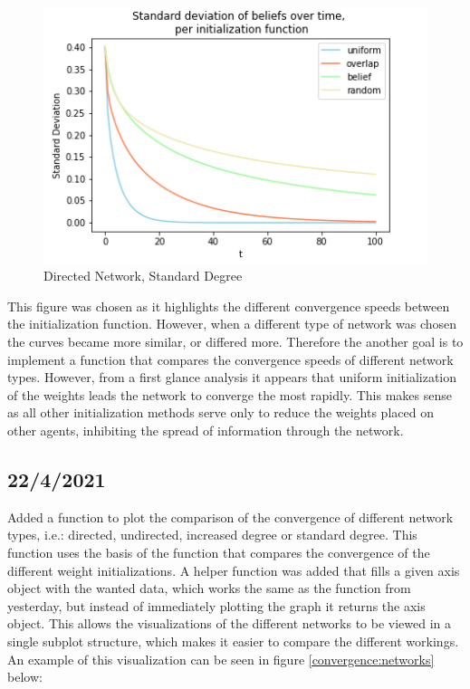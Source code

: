 \documentclass{article}
\begin{document}
\begin{center}
    \begin{figure}[!htbp]
        \centering
        \includegraphics[width=.8\textwidth]{ThesisKI/Images/Convergence_comparison_std_dir.png}
        \caption{Directed Network, Standard Degree}
        \label{convergence:comparison}
    \end{figure}
\end{center}

This figure was chosen as it highlights the different convergence speeds between the initialization function. However, when a different type of network was chosen the curves became more similar, or differed more. Therefore the another goal is to implement a function that compares the convergence speeds of different network types. However, from a first glance analysis it appears that uniform initialization of the weights leads the network to converge the most rapidly. This makes sense as all other initialization methods serve only to reduce the weights placed on other agents, inhibiting the spread of information through the network.

\newpage

\subsection{22/4/2021}
Added a function to plot the comparison of the convergence of different network types, i.e.: directed, undirected, increased degree or standard degree. This function uses the basis of the function that compares the convergence of the different weight initializations. A helper function was added that fills a given axis object with the wanted data, which works the same as the function from yesterday, but instead of immediately plotting the graph it returns the axis object. This allows the visualizations of the different networks to be viewed in a single subplot structure, which makes it easier to compare the different workings. An example of this visualization can be seen in figure \ref{convergence:networks} below:
\end{document}
